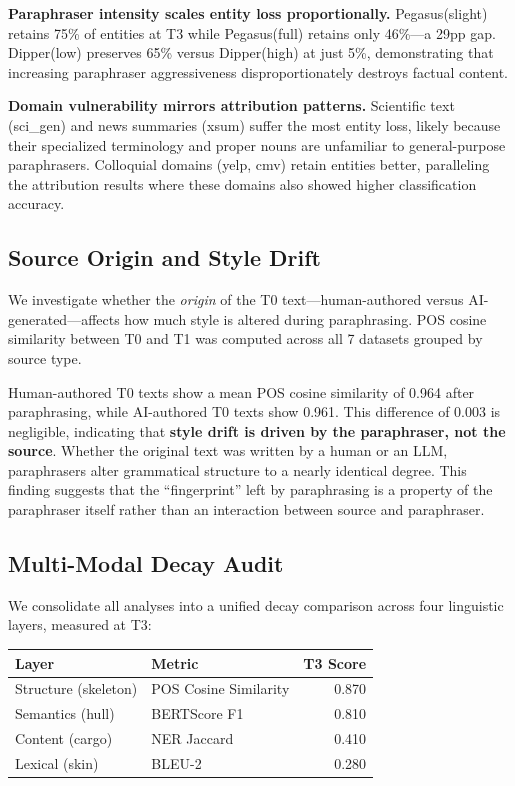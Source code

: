\documentclass[10pt,twocolumn]{article}
\begin{document}
\textbf{Paraphraser intensity scales entity loss proportionally.}
Pegasus(slight) retains 75\% of entities at T3 while Pegasus(full) retains
only 46\%---a 29pp gap. Dipper(low) preserves 65\% versus Dipper(high) at
just 5\%, demonstrating that increasing paraphraser aggressiveness
disproportionately destroys factual content.

\textbf{Domain vulnerability mirrors attribution patterns.} Scientific
text (sci\_gen) and news summaries (xsum) suffer the most entity loss,
likely because their specialized terminology and proper nouns are
unfamiliar to general-purpose paraphrasers. Colloquial domains (yelp, cmv)
retain entities better, paralleling the attribution results where
these domains also showed higher classification accuracy.

\subsection{Source Origin and Style Drift}

We investigate whether the \emph{origin} of the T0 text---human-authored
versus AI-generated---affects how much style is altered during paraphrasing.
POS cosine similarity between T0 and T1 was computed across all 7 datasets
grouped by source type.

Human-authored T0 texts show a mean POS cosine similarity of 0.964 after
paraphrasing, while AI-authored T0 texts show 0.961. This difference of
0.003 is negligible, indicating that \textbf{style drift is driven by the
paraphraser, not the source}. Whether the original text was written by a
human or an LLM, paraphrasers alter grammatical structure to a nearly
identical degree. This finding suggests that the ``fingerprint'' left by
paraphrasing is a property of the paraphraser itself rather than an
interaction between source and paraphraser.

\subsection{Multi-Modal Decay Audit}

We consolidate all analyses into a unified decay comparison across four
linguistic layers, measured at T3:

\begin{center}
\small
\begin{tabular}{llr}
\toprule
\textbf{Layer} & \textbf{Metric} & \textbf{T3 Score} \\
\midrule
Structure (skeleton) & POS Cosine Similarity & 0.870 \\
Semantics (hull)     & BERTScore F1          & 0.810 \\
Content (cargo)      & NER Jaccard           & 0.410 \\
Lexical (skin)       & BLEU-2                & 0.280 \\
\bottomrule
\end{tabular}
\label{tab:multimodal}
\end{center}
\end{document}
